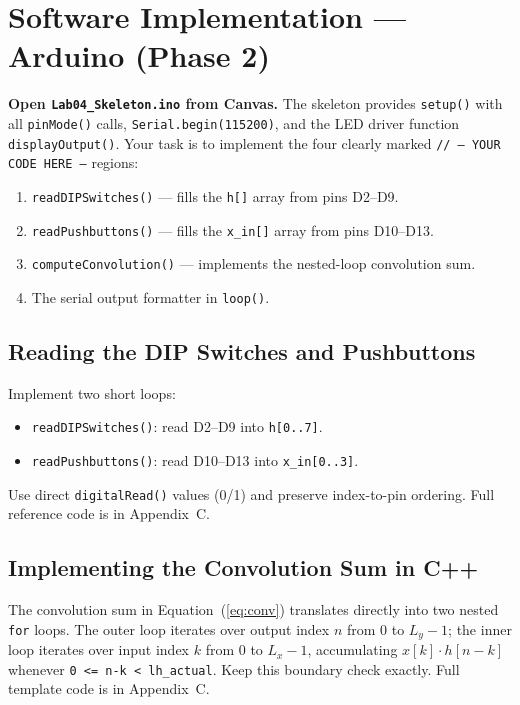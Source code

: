 \documentclass[11pt,letterpaper]{article}
\begin{document}
\clearpage

\section{Software Implementation --- Arduino (Phase 2)}

\textbf{Open \texttt{Lab04\_Skeleton.ino} from Canvas.} The skeleton provides \texttt{setup()} with all \texttt{pinMode()} calls, \texttt{Serial.begin(115200)}, and the LED driver function \texttt{displayOutput()}. Your task is to implement the four clearly marked \texttt{// --- YOUR CODE HERE ---} regions:
\begin{enumerate}[nosep]
    \item \texttt{readDIPSwitches()} --- fills the \texttt{h[]} array from pins D2--D9.
    \item \texttt{readPushbuttons()} --- fills the \texttt{x\_in[]} array from pins D10--D13.
    \item \texttt{computeConvolution()} --- implements the nested-loop convolution sum.
    \item The serial output formatter in \texttt{loop()}.
\end{enumerate}

\subsection{Reading the DIP Switches and Pushbuttons}

Implement two short loops:
\begin{itemize}[nosep]
    \item \texttt{readDIPSwitches()}: read D2--D9 into \texttt{h[0..7]}.
    \item \texttt{readPushbuttons()}: read D10--D13 into \texttt{x\_in[0..3]}.
\end{itemize}
Use direct \texttt{digitalRead()} values (0/1) and preserve index-to-pin ordering. Full reference code is in Appendix~C.

\subsection{Implementing the Convolution Sum in C++}

The convolution sum in Equation~(\ref{eq:conv}) translates directly into two nested \texttt{for} loops. The outer loop iterates over output index $n$ from 0 to $L_y - 1$; the inner loop iterates over input index $k$ from 0 to $L_x - 1$, accumulating $x[k] \cdot h[n-k]$ whenever \texttt{0 <= n-k < lh\_actual}. Keep this boundary check exactly. Full template code is in Appendix~C.
\end{document}

